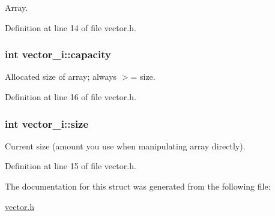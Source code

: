 \-Array. 



\-Definition at line 14 of file vector.\-h.

\hypertarget{structvector__i_af108aa670ac888975024a428c31f27fc}{
\subsubsection[{capacity}]{\setlength{\rightskip}{0pt plus 5cm}int {\bf vector\-\_\-i\-::capacity}}}\label{structvector__i_af108aa670ac888975024a428c31f27fc}


\-Allocated size of array; always $>$= size. 



\-Definition at line 16 of file vector.\-h.

\hypertarget{structvector__i_a04afc9e861d169d920fc8d2a26b670cd}{
\subsubsection[{size}]{\setlength{\rightskip}{0pt plus 5cm}int {\bf vector\-\_\-i\-::size}}}\label{structvector__i_a04afc9e861d169d920fc8d2a26b670cd}


\-Current size (amount you use when manipulating array directly). 



\-Definition at line 15 of file vector.\-h.



\-The documentation for this struct was generated from the following file\-:\begin{DoxyCompactItemize}
\item 
\hyperlink{vector_8h}{vector.\-h}\end{DoxyCompactItemize}
